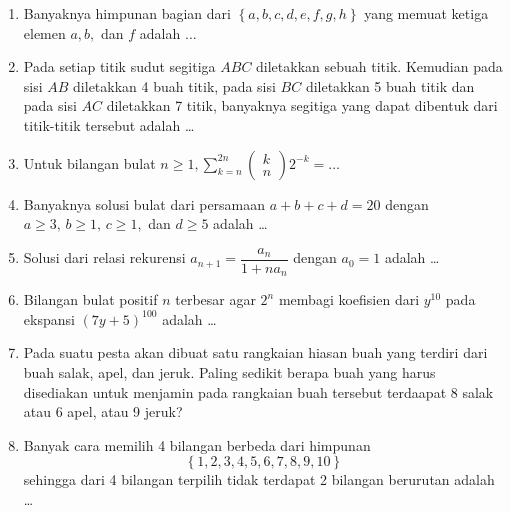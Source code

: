 \documentclass[12pt,twoside]{article}
\begin{document}
\begin{enumerate}
	\item Banyaknya himpunan bagian dari $\left\lbrace a,b,c,d,e,f,g,h \right\rbrace$ yang memuat ketiga elemen $a,b, $ dan $f$ adalah $\dots$

	\item Pada setiap titik sudut segitiga $ABC$ diletakkan sebuah titik. Kemudian pada sisi $AB$ diletakkan 4 buah titik, pada sisi $BC$ diletakkan 5 buah titik dan pada sisi $AC$ diletakkan 7 titik, banyaknya segitiga yang dapat dibentuk dari titik-titik tersebut adalah \dots

	\item Untuk bilangan bulat $n \geq 1, \displaystyle \sum_{k=n}^{2n} \left( \begin{array}{c}
				      k \\n
			      \end{array} \right)2^{-k} =\dots$

	\item Banyaknya solusi bulat dari persamaan $a+b+c+d = 20$ dengan $a \geq 3,\, b \geq 1,\, c \geq 1, $ dan $d \geq 5$ adalah \dots

	\item Solusi dari relasi rekurensi $a_{n+1} = \dfrac{a_{n}}{1+na_{n}}$ dengan $a_0 = 1$ adalah \dots

	\item Bilangan bulat positif $n$ terbesar agar $2^n$ membagi koefisien dari $y^{10}$ pada ekspansi $(7y+5)^{100}$ adalah \dots

	\item Pada suatu pesta akan dibuat satu rangkaian hiasan buah yang terdiri dari buah salak, apel, dan jeruk. Paling sedikit berapa buah yang harus disediakan untuk menjamin pada rangkaian buah tersebut terdaapat 8 salak atau 6 apel, atau 9 jeruk?

	\item Banyak cara memilih 4 bilangan berbeda dari himpunan $$\left\lbrace 1,2,3,4,5,6,7,8,9,10  \right\rbrace$$ sehingga dari 4 bilangan terpilih tidak terdapat 2 bilangan berurutan adalah \dots


\end{enumerate}
\end{document}

